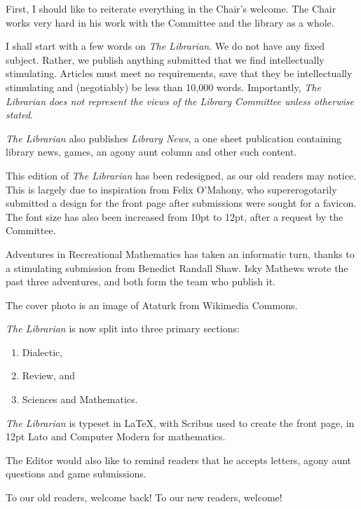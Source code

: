 \documentclass[12pt,a4paper]{report}
\begin{document}
\begin{multicols}{2}
\begin{multicols}{2}

First, I should like to reiterate everything in the Chair's welcome. The Chair works very hard in his work with the Committee and the library as a whole.

I shall start with a few words on \textit{The Librarian}. We do not have any fixed subject. Rather, we publish anything submitted that we find intellectually stimulating. Articles must meet no requirements, save that they be intellectually stimulating and (negotiably) be less than 10,000 words. Importantly, \textit{The Librarian} \textit{does not represent the views of the Library Committee unless otherwise stated}.

\textit{The Librarian} also publishes \textit{Library News}, a one sheet publication containing library news, games, an agony aunt column and other such content.

This edition of \textit{The Librarian} has been redesigned, as our old readers may notice. This is largely due to inspiration from Felix O'Mahony, who supererogotarily submitted a design for the front page after submissions were sought for a favicon. The font size has also been increased from 10pt to 12pt, after a request by the Committee.

Adventures in Recreational Mathematics has taken an informatic turn, thanks to a stimulating submission from Benedict Randall Shaw. Isky Mathews wrote the past three adventures, and both form the team who publish it.

The cover photo is an image of Ataturk from Wikimedia Commons.

\textit{The Librarian} is now split into three primary sections:
\begin{enumerate}
	\item Dialectic,
	\item Review, and
	\item Sciences and Mathematics.
\end{enumerate}

\textit{The Librarian} is typeset in \LaTeX, with Scribus used to create the front page, in 12pt Lato and Computer Modern for mathematics.

The Editor would also like to remind readers that he accepts letters, agony aunt questions and game submissions.

To our old readers, welcome back! To our new readers, welcome!

\end{multicols}


\end{multicols}
\end{document}

